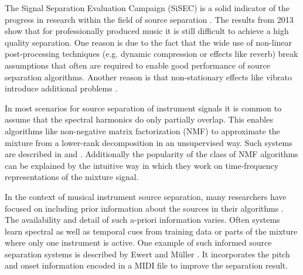 The Signal Separation Evaluation Campaign (SiSEC) is a solid indicator of the progress in research within the field of source separation \cite{vincent12}. The results from 2013 \cite{sisec13} show that for professionally produced music it is still difficult to achieve a high quality separation.
One reason is due to the fact that the wide use of non-linear post-processing techniques (e.g. dynamic compression or effects like reverb) break assumptions that often are required to enable good performance of source separation algorithms. Another reason is that non-stationary effects like vibrato introduce additional problems \cite{nakano10}.

In most scenarios for source separation of instrument signals it is common to assume that the spectral harmonics do only partially overlap. This enables algorithms like non-negative matrix factorization (NMF) to approximate the mixture from a lower-rank decomposition in an unsupervised way. Such systems are described in \cite{smaragdis03} and \cite{virtanen07}. Additionally the popularity of the class of NMF algorithms can be explained by the intuitive way in which they work on time-frequency representations of the mixture signal.

In the context of musical instrument source separation, many researchers have focused on including prior information about the sources in their algorithms \cite{ozerov12}. The availability and detail of such a-priori information varies. Often systems learn spectral as well as temporal cues from training data or parts of the mixture where only one instrument is active. One example of such informed source separation systems is described by Ewert and M\"uller \cite{ewert12}. It incorporates the pitch and onset information encoded in a MIDI file to improve the separation result.

